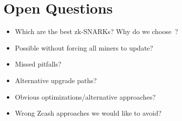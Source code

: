\section{Open Questions}
  \begin{itemize}
    \item Which are the best zk-SNARKs? Why do we
    choose~\cite{DBLP:conf/eurocrypt/Groth16}?
    \item Possible without forcing all miners to update?
    \item Missed pitfalls?
    \item Alternative upgrade paths?
    \item Obvious optimizations/alternative approaches?
    \item Wrong Zcash approaches we would like to avoid?
  \end{itemize}
